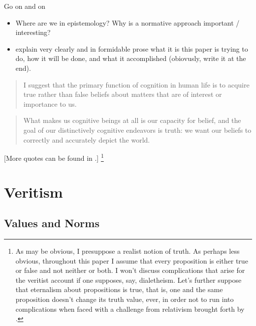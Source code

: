 \documentclass[12pt,numbers=noenddot]{scrartcl}
\begin{document}
Go on and on
\begin{itemize}
    \item Where are we in epistemology? Why is a normative approach important / interesting?
    \item explain very clearly and in formidable prose what it is this paper is trying to do, how it will be done, and what it accomplished (obiovusly, write it at the end).
\end{itemize}

\begin{quote}
 I suggest that the primary function of cognition in human life is to acquire true rather than false beliefs about matters that are of interest or importance to us. \textcite[29]{Alston2005-ALSBJD}
\end{quote}

\begin{quote}
What makes us cognitive beings at all is our capacity for belief, and the goal of our distinctively cognitive endeavors is truth: we want our beliefs to correctly and accurately depict the world. \textcite[7]{Bonjour1985}
\end{quote}

[More quotes can be found in \textcite{Goldman2002-GOLTUO-2}.]
\footnote{As may be obvious, I presuppose a realist notion of truth. As perhaps less obvious, throughout this paper I assume that every proposition is either true or false and not neither or both. I won't discuss complications that arise for the veritist account if one supposes, say, dialetheism. Let's further suppose that eternalism about propositions is true, that is, one and the same proposition doesn't change its truth value, ever, in order not to run into complications when faced with a challenge from relativism brought forth by \textcite{Brogaard2008-BROTTA-3}.}

\section{Veritism}
\subsection{Values and Norms}\label{sec:values}
\end{document}
